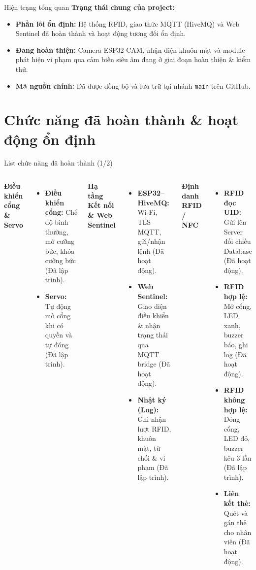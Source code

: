 \documentclass[aspectratio=169]{beamer}
\begin{document}
\begin{frame}{Hiện trạng tổng quan} 
  \textbf{Trạng thái chung của project:}
  \vspace{0.6em}
  \begin{itemize}
    \item \textbf{Phần lõi ổn định:} Hệ thống RFID, giao thức MQTT (HiveMQ) và Web Sentinel đã hoàn thành và hoạt động tương đối ổn định.
    \item \textbf{Đang hoàn thiện:} Camera ESP32-CAM, nhận diện khuôn mặt và module phát hiện vi phạm qua cảm biến siêu âm đang ở giai đoạn hoàn thiện \& kiểm thử.
    \item \textbf{Mã nguồn chính:} Đã được đồng bộ và lưu trữ tại nhánh \texttt{main} trên GitHub.
  \end{itemize}
\end{frame}

\section{Chức năng đã hoàn thành \& hoạt động ổn định}

\begin{frame}{List chức năng đã hoàn thành (1/2)}
  \begin{columns}[T]
      \textbf{Điều khiển cổng \& Servo}
      \begin{itemize}
        \item \textbf{Điều khiển cổng:} Chế độ bình thường, mở cưỡng bức, khóa cưỡng bức (Đã lập trình).
        \item \textbf{Servo:} Tự động mở cổng khi có quyền và tự đóng (Đã lập trình).
      \end{itemize}
      \vspace{0.2em} 
      \textbf{Hạ tầng Kết nối \& Web Sentinel}
      \begin{itemize}
        \item \textbf{ESP32--HiveMQ:} Wi-Fi, TLS MQTT, gửi/nhận lệnh (Đã hoạt động).
        \item \textbf{Web Sentinel:} Giao diện điều khiển \& nhận trạng thái qua MQTT bridge (Đã hoạt động).
        \item \textbf{Nhật ký (Log):} Ghi nhận lượt RFID, khuôn mặt, từ chối \& vi phạm (Đã lập trình).
      \end{itemize}

      \textbf{Định danh RFID / NFC}
      \begin{itemize}
        \item \textbf{RFID đọc UID:} Gửi lên Server đối chiếu Database (Đã hoạt động).
        \item \textbf{RFID hợp lệ:} Mở cổng, LED xanh, buzzer báo, ghi log (Đã hoạt động).
        \item \textbf{RFID không hợp lệ:} Đóng cổng, LED đỏ, buzzer kêu 3 lần (Đã lập trình).
        \item \textbf{Liên kết thẻ:} Quét và gán thẻ cho nhân viên (Đã hoạt động).
      \end{itemize}
  \end{columns}
\end{frame}
\end{document}
